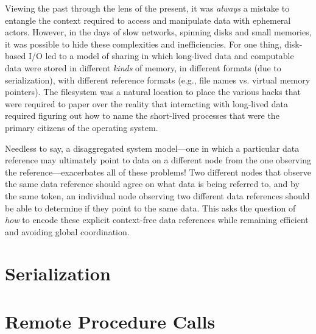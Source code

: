 {    %

    Viewing the past through the lens of the present, it was \emph{always} a mistake to entangle the context required to access
    and manipulate data with ephemeral actors.  However, in the days of slow networks, spinning disks and small memories,
    it was possible to hide these complexities and inefficiencies.  For one thing, disk-based I/O led to a model of sharing in
    which long-lived data and computable data were stored in different \emph{kinds} of memory, in different formats (due to serialization),
    with different reference formats (e.g., file names vs. virtual memory pointers).
    The filesystem was a natural location to place the various hacks that were required to paper over the reality
    that interacting with long-lived data required figuring out how to name the short-lived processes that were the primary
    citizens of the operating system.

    Needless to say, a disaggregated system model---one in which a particular data reference may
    ultimately point to data on a different node from the one observing the reference---exacerbates all of these problems!
    Two different nodes that observe the same data reference should agree on what data is
    being referred to, and by the same token, an individual node observing two different data references
    should be able to determine if they point to the same data. This asks the question of \emph{how}
    to encode these explicit context-free data references while remaining efficient and avoiding global
    coordination.

}


\section{Serialization}

\section{Remote Procedure Calls}


